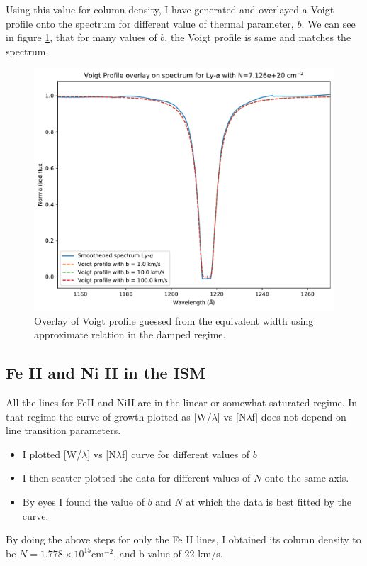 \documentclass[12pt]{article}
\begin{document}
Using this value for column density, I have generated and overlayed a Voigt profile onto the spectrum for different value of thermal parameter, $b$. We can see in figure \ref{fig:voigt-ly-a_overlay}, that for many values of $b$, the Voigt profile is same and matches the spectrum.

 
\begin{figure}[H]
\centering
\includegraphics[width=0.9\linewidth]{../Voigt-Ly-a_overlay}
\caption{Overlay of Voigt profile guessed from the equivalent width using approximate relation in the damped regime.}
\label{fig:voigt-ly-a_overlay}
\end{figure}
 
\newpage 
\subsection{Fe II and Ni II in the ISM}
All the lines for FeII and NiII are in the linear or somewhat saturated regime. In that regime the curve of growth plotted as  [W/$\lambda$] vs [N$\lambda$f] does not depend on line transition parameters.
\begin{itemize}
\item{ I plotted [W/$\lambda$] vs [N$\lambda$f] curve for different values of $b$}
\item{I then scatter plotted the data for different values of $N$ onto the same axis.}
\item{By eyes I found the value of $b$ and $N$ at which the data is best fitted by the curve.}
\end{itemize}

By doing the above steps for only the Fe II lines, I obtained its column density to be $N=1.778 \times 10^{15}$cm$^{-2}$, and b value of 22 km/s.
\end{document}

